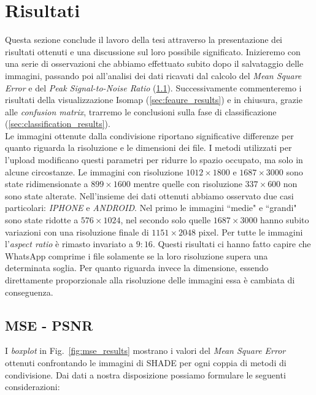 \chapter{Risultati}
\label{cha:risultati}

Questa sezione conclude il lavoro della tesi attraverso la presentazione dei risultati ottenuti e una discussione sul loro possibile significato. Inizieremo con una serie di osservazioni che abbiamo effettuato subito dopo il salvataggio delle immagini, passando poi all'analisi dei dati ricavati dal calcolo del \textit{Mean Square Error} e del \textit{Peak Signal-to-Noise Ratio} (\ref{sec:mse_psnr_results}). Successivamente commenteremo i risultati della visualizzazione Isomap (\ref{sec:feaure_results}) e in chiusura, grazie alle \textit{confusion matrix}, trarremo le conclusioni sulla fase di classificazione (\ref{sec:classification_results}).\\

Le immagini ottenute dalla condivisione riportano significative differenze per quanto riguarda la risoluzione e le dimensioni dei file. I metodi utilizzati per l'upload modificano questi parametri per ridurre lo spazio occupato, ma solo in alcune circostanze. Le immagini con risoluzione $1012\times1800$ e $1687\times3000$ sono state ridimensionate a $899\times1600$ mentre quelle con risoluzione $337\times600$ non sono state alterate. Nell'insieme dei dati ottenuti abbiamo osservato due casi particolari: \textit{IPHONE} e \textit{ANDROID}. Nel primo le immagini “medie" e “grandi" sono state ridotte a $576\times1024$, nel secondo solo quelle $1687\times3000$ hanno subito variazioni con una risoluzione finale di $1151\times2048$ pixel. Per tutte le immagini l'\textit{aspect ratio} è rimasto invariato a $9:16$. Questi risultati ci hanno fatto capire che WhatsApp comprime i file solamente se la loro risoluzione supera una determinata soglia. Per quanto riguarda invece la dimensione, essendo direttamente proporzionale alla risoluzione delle immagini essa è cambiata di conseguenza.

\section{MSE - PSNR}
\label{sec:mse_psnr_results}
I \textit{boxplot} in Fig.~\ref{fig:mse_results} mostrano i valori del \textit{Mean Square Error} ottenuti confrontando le immagini di SHADE per ogni coppia di metodi di condivisione. Dai dati a nostra disposizione possiamo formulare le seguenti considerazioni:

